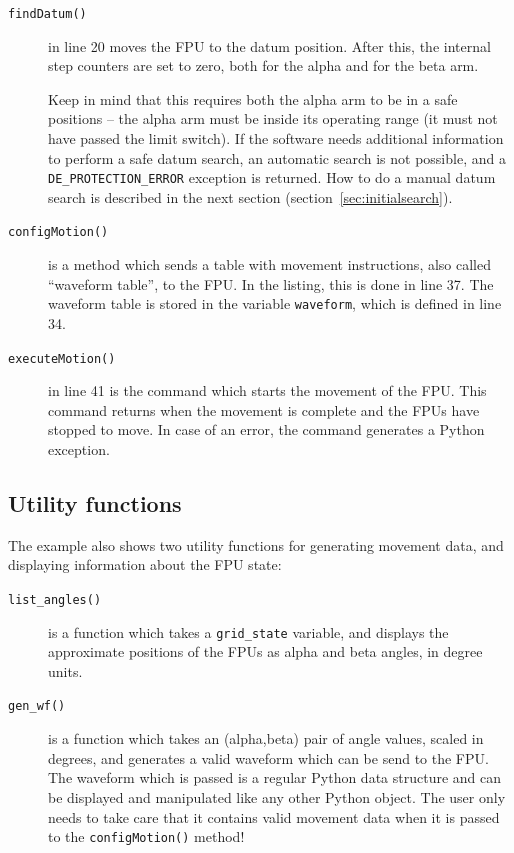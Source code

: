 \documentclass[11pt,a4paper]{scrartcl}
\begin{document}
\begin{description}
\item[\texttt{findDatum()}] in line 20 moves the FPU to the datum
  position. After this, the internal step counters are set to zero,
  both for the alpha and for the beta arm.

  Keep in mind that this requires both the alpha arm to be in a safe
  positions -- the alpha arm must be inside its operating range (it
  must not have passed the limit switch). If the software needs
  additional information to perform a safe datum search, an automatic
  search is not possible, and a \texttt{DE\_PROTECTION\_ERROR}
  exception is returned. How to do a manual datum search is described
  in the next section (section~\ref{sec:initialsearch}).

\item[\texttt{configMotion()}] is a method which sends a table with
  movement instructions, also called ``waveform table'', to the
  FPU. In the listing, this is done in line 37. The waveform table is
  stored in the variable \texttt{waveform}, which is defined in line
  34.

\item[\texttt{executeMotion()}] in line 41 is the command which starts
  the movement of the FPU. This command returns when the movement is
  complete and the FPUs have stopped to move. In case of an error, the
  command generates a Python exception.

\end{description}

\subsection{Utility functions}
The example also shows two utility functions for generating movement
data, and displaying information about the FPU state:

\begin{description}
\item[\texttt{list\_angles()}] is a function which takes a \texttt{grid\_state}
  variable, and displays the approximate positions of the FPUs as
  alpha and beta angles, in degree units.

\item[\texttt{gen\_wf()}] is a function which takes an (alpha,beta)
  pair of angle values, scaled in degrees, and generates a valid
  waveform which can be send to the FPU.  The waveform which is passed
  is a regular Python data structure and can be displayed and
  manipulated like any other Python object.  The user only needs to
  take care that it contains valid movement data when it is passed to
  the \texttt{configMotion()} method!


\end{description}
\end{document}

